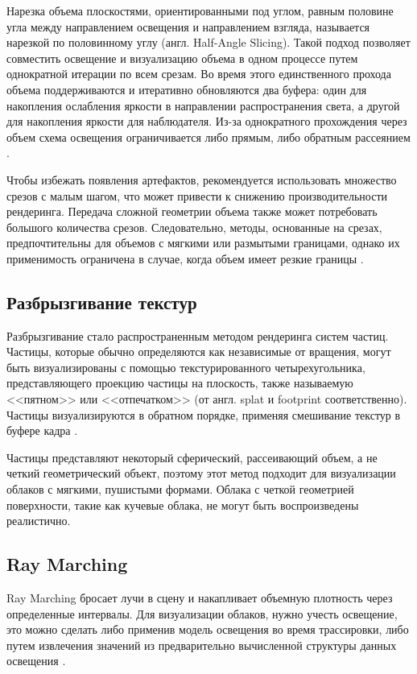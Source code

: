 Нарезка объема плоскостями, ориентированными под углом, равным половине угла между направлением освещения и направлением взгляда, называется нарезкой по половинному углу (англ. Half-Angle Slicing). Такой подход позволяет совместить освещение и визуализацию объема в одном процессе путем однократной итерации по всем срезам. Во время этого единственного прохода объема поддерживаются и итеративно обновляются два буфера: один для накопления ослабления яркости в направлении распространения света, а другой для накопления яркости для наблюдателя. Из-за однократного прохождения через объем схема освещения ограничивается либо прямым, либо обратным рассеянием \cite{clouds}. 

Чтобы избежать появления артефактов, рекомендуется использовать множество срезов с малым шагом, что может привести к снижению производительности рендеринга. Передача сложной геометрии объема также может потребовать большого количества срезов. Следовательно, методы, основанные на срезах, предпочтительны для объемов с мягкими или размытыми границами, однако их применимость ограничена в случае, когда объем имеет резкие границы \cite{clouds}.

\subsection{Разбрызгивание текстур}
\label{splatting}
Разбрызгивание стало распространенным методом рендеринга систем частиц. Частицы, которые обычно определяются как независимые от вращения, могут быть визуализированы с помощью текстурированного четырехугольника, представляющего проекцию частицы на плоскость, также называемую <<пятном>> или <<отпечатком>> (от англ. splat и footprint соответственно). Частицы визуализируются в обратном порядке, применяя смешивание текстур в буфере кадра \cite{voxel, clouds}. 

Частицы представляют некоторый сферический, рассеивающий объем, а не четкий геометрический объект, поэтому этот метод подходит для визуализации облаков с мягкими, пушистыми формами. Облака с четкой геометрией поверхности, такие как кучевые облака, не могут быть воспроизведены реалистично.


\subsection{Ray Marching}
\label{ray}
Ray Marching бросает лучи в сцену и накапливает объемную плотность через определенные интервалы. Для визуализации облаков, нужно учесть освещение, это можно сделать либо применив модель освещения во время трассировки, либо путем извлечения значений из предварительно вычисленной структуры данных освещения \cite{hzd, frostbite, clouds}.

